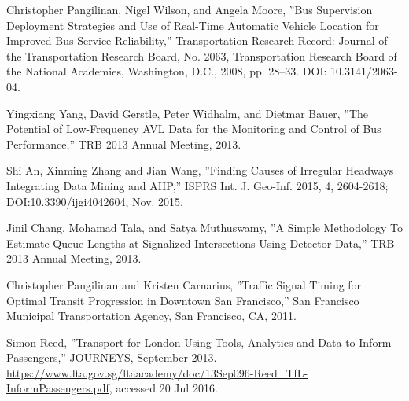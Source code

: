 \documentclass[12pt,journal,compsoc]{IEEEtran}
\begin{document}
\begin{thebibliography}{14}
Christopher Pangilinan, Nigel Wilson, and Angela Moore, ''Bus Supervision Deployment Strategies and Use of Real-Time Automatic
Vehicle Location for Improved Bus Service Reliability,'' Transportation Research Record: Journal of the Transportation Research Board, No. 2063, Transportation Research Board of the National Academies, Washington, D.C., 2008, pp. 28–33. DOI: 10.3141/2063-04.

Yingxiang Yang, David Gerstle, Peter Widhalm, and Dietmar Bauer, ''The Potential of Low-Frequency AVL Data for the Monitoring and Control of Bus Performance,'' TRB 2013 Annual Meeting, 2013.

Shi An, Xinming Zhang and Jian Wang, ''Finding Causes of Irregular Headways Integrating Data Mining and AHP,'' ISPRS Int. J. Geo-Inf. 2015, 4, 2604-2618; DOI:10.3390/ijgi4042604, Nov. 2015.

Jinil Chang, Mohamad Tala, and Satya Muthuswamy, ''A Simple Methodology To Estimate Queue Lengths at Signalized Intersections Using Detector Data,'' TRB 2013 Annual Meeting, 2013.

Christopher Pangilinan and Kristen Carnarius, ''Traffic Signal Timing for Optimal Transit Progression in Downtown San Francisco,'' San Francisco Municipal Transportation Agency, San Francisco, CA, 2011.

Simon Reed, ''Transport for London Using Tools, Analytics and Data to Inform Passengers,'' JOURNEYS, September 2013. \url{https://www.lta.gov.sg/ltaacademy/doc/13Sep096-Reed_TfL-InformPassengers.pdf}, accessed 20 Jul 2016.

\end{thebibliography}

% 

\end{document}
